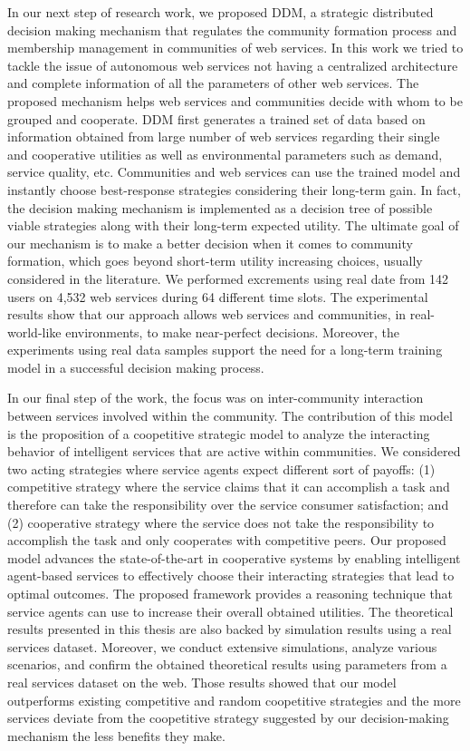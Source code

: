 In our next step of research work, we proposed DDM, a strategic distributed decision making mechanism that regulates the community formation process and membership management in communities of web services. In this work we tried to tackle the issue of autonomous web services not having a centralized architecture and complete information of all the parameters of other web services. The proposed mechanism helps web services and communities decide with whom to be grouped and cooperate. DDM first generates a trained set of data based on information obtained from large number of web services regarding their single and cooperative utilities as well as environmental parameters such as demand, service quality, etc. Communities and web services can use the trained model and instantly choose best-response strategies considering their long-term gain. In fact, the decision making mechanism is implemented as a decision tree of possible viable strategies along with their long-term expected utility. The ultimate goal of our mechanism is to make a better decision when it comes to community formation, which goes beyond short-term utility increasing choices, usually considered in the literature. We performed excrements using real date from 142 users on 4,532 web services during 64 different time slots. The experimental results show that our approach allows web services and communities, in real-world-like environments, to make near-perfect decisions. Moreover, the experiments using real data samples support the need for a long-term training model in a successful decision making process.

In our final step of the work, the focus was on inter-community interaction between services involved within the community. The contribution of this model is the proposition of a coopetitive strategic model to analyze the interacting behavior of intelligent services that are active within communities. We considered two acting strategies where service agents expect different sort of payoffs: (1) competitive strategy where the service claims that it can accomplish a task and therefore can take the responsibility over the service consumer satisfaction; and (2) cooperative strategy where the service does not take the responsibility to accomplish the task and only cooperates with competitive peers. Our proposed model advances the state-of-the-art in cooperative systems by enabling intelligent agent-based services to effectively choose their interacting strategies that lead to optimal outcomes. The proposed framework provides a reasoning technique that service agents can use to increase their overall obtained utilities. The theoretical results presented in this thesis are also backed by simulation results using a real services dataset. Moreover, we conduct extensive simulations, analyze various scenarios, and confirm the obtained theoretical results using parameters from a real services dataset on the web. Those results showed that our model outperforms existing competitive and random coopetitive strategies and the more
services deviate from the coopetitive strategy suggested by our decision-making mechanism the less benefits they make.



